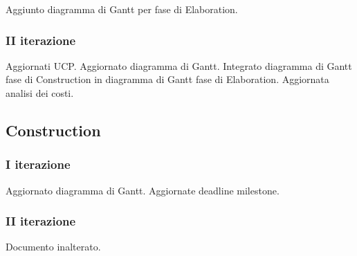 \documentclass[10pt]{softeng}
\begin{document}
Aggiunto diagramma di Gantt per fase di Elaboration.

\subsubsection{II iterazione}

Aggiornati UCP.
Aggiornato diagramma di Gantt.
Integrato diagramma di Gantt fase di Construction in diagramma di Gantt fase di Elaboration.
Aggiornata analisi dei costi.

\subsection{Construction}

\subsubsection{I iterazione}

Aggiornato diagramma di Gantt.
Aggiornate deadline milestone.

\subsubsection{II iterazione}

Documento inalterato.
\end{document}
